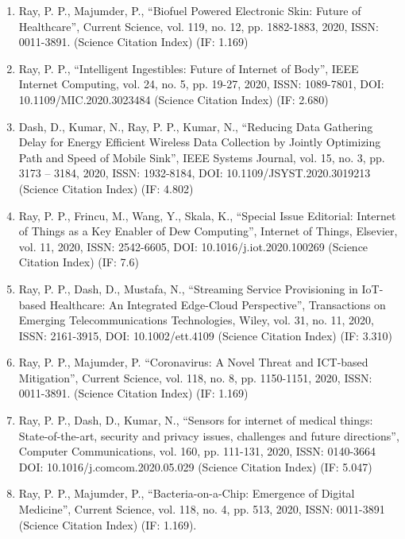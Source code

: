 \documentclass[11pt,a4paper]{moderncv}
\begin{document}
\begin{adjustwidth}{6em}{0pt}
\begin{enumerate}
		\item 	Ray, P. P., Majumder, P., “Biofuel Powered Electronic Skin: Future of Healthcare”, Current Science, vol. 119, no. 12, pp. 1882-1883, 2020, ISSN: 0011-3891. (Science Citation Index) (IF: 1.169) 
		
		\item Ray, P. P., “Intelligent Ingestibles: Future of Internet of Body”, IEEE Internet Computing, vol. 24, no. 5, pp. 19-27, 2020, ISSN: 1089-7801, DOI: 10.1109/MIC.2020.3023484 (Science Citation Index) (IF: 2.680) 
		
		\item Dash, D., Kumar, N., Ray, P. P., Kumar, N., “Reducing Data Gathering Delay for Energy Efficient Wireless Data Collection by Jointly Optimizing Path and Speed of Mobile Sink”, IEEE Systems Journal, vol. 15, no. 3, pp. 3173 – 3184, 2020, ISSN: 1932-8184, DOI: 10.1109/JSYST.2020.3019213 (Science Citation Index) (IF: 4.802)
		
		\item Ray, P. P., Frincu, M., Wang, Y., Skala, K., “Special Issue Editorial: Internet of Things as a Key Enabler of Dew Computing”, Internet of Things, Elsevier, vol. 11, 2020, ISSN: 2542-6605, DOI: 10.1016/j.iot.2020.100269 (Science Citation Index) (IF: 7.6)
		
		\item Ray, P. P., Dash, D., Mustafa, N., “Streaming Service Provisioning in IoT-based Healthcare: An Integrated Edge-Cloud Perspective”, Transactions on Emerging Telecommunications Technologies, Wiley, vol. 31, no. 11, 2020, ISSN: 2161-3915, DOI: 10.1002/ett.4109 (Science Citation Index) (IF: 3.310) 
		
		\item Ray, P. P., Majumder, P. “Coronavirus: A Novel Threat and ICT-based Mitigation”, Current Science, vol. 118, no. 8, pp. 1150-1151, 2020, ISSN: 0011-3891. (Science Citation Index) (IF: 1.169)
		
		\item Ray, P. P., Dash, D., Kumar, N., “Sensors for internet of medical things: State-of-the-art, security and privacy issues, challenges and future directions”, Computer Communications, vol. 160, pp. 111-131, 2020, ISSN: 0140-3664 DOI: 10.1016/j.comcom.2020.05.029 (Science Citation Index) (IF: 5.047) 
		
		\item Ray, P. P., Majumder, P., “Bacteria-on-a-Chip: Emergence of Digital Medicine”, Current Science, vol. 118, no. 4, pp. 513, 2020, ISSN: 0011-3891 (Science Citation Index) (IF: 1.169). 
		

\end{enumerate}
\end{adjustwidth}
\end{document}
